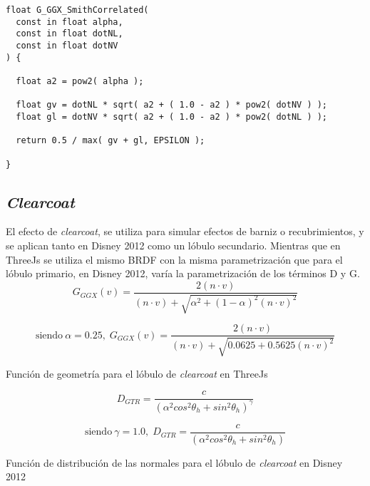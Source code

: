 \begin{lstlisting}[caption=Clase MeshClothMaterial]
float G_GGX_SmithCorrelated(
  const in float alpha,
  const in float dotNL,
  const in float dotNV
) {

  float a2 = pow2( alpha );

  float gv = dotNL * sqrt( a2 + ( 1.0 - a2 ) * pow2( dotNV ) );
  float gl = dotNV * sqrt( a2 + ( 1.0 - a2 ) * pow2( dotNL ) );

  return 0.5 / max( gv + gl, EPSILON );

}
\end{lstlisting}

  \subsection*{\textit{Clearcoat}}
  El efecto de \textit{clearcoat}, se utiliza para simular efectos de barniz o recubrimientos, y se aplican tanto en Disney
  2012 como un l\'obulo secundario. Mientras que en ThreeJs se utiliza el mismo BRDF con la misma parametrizaci\'on que para
  el l\'obulo primario, en Disney 2012, var\'ia la parametrizaci\'on de los t\'erminos D y G.\\

  $$
  G_{GGX}(v) = \frac
  {2 (n \cdot{v})}
  {(n \cdot{v}) + \sqrt{ \alpha^2 + (1 - \alpha)^2 (n \cdot{v})^2 }}
  $$
  \begin{eqfloat}[!htb]
    \begin{equation}
    \textrm{siendo}\ \alpha=0.25,\;
    G_{GGX}(v) = \frac
    {2 (n \cdot{v})}
    {(n \cdot{v}) + \sqrt{ 0.0625 + 0.5625 (n \cdot{v})^2 }}
    \end{equation}
  \caption{Funci\'on de geometr\'ia para el l\'obulo de \textit{clearcoat} en ThreeJs}
  \end{eqfloat}
  \singlespacing

  $$
  D_{GTR} = \frac
  {c}
  {(\alpha^2 cos^2 \theta_h + sin^2 \theta_h)^\gamma}
  $$
  \begin{eqfloat}[!htb]
    \begin{equation}
    \textrm{siendo}\ \gamma=1.0,\;
    D_{GTR} = \frac
    {c}
    {(\alpha^2 cos^2 \theta_h + sin^2 \theta_h)}
    \end{equation}
  \caption{Funci\'on de distribuci\'on de las normales para el l\'obulo de \textit{clearcoat} en Disney 2012}
  \end{eqfloat}
  \singlespacing

